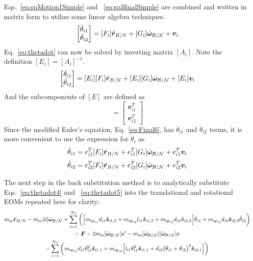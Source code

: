 \documentclass[paper]{aiaaNew}
\begin{document}
	Eqs.~\eqref{eq:spMotion1Simple} and ~\eqref{eq:sp3finalSimple} are combined and written in matrix form to utilize some linear algebra techniques.
	\begin{equation}
	[A_i]\begin{bmatrix}
	\ddot \theta_{i1}\\
	\ddot \theta_{i2}
	\end{bmatrix}
	= [F_i] \ddot{\bm r}_{B/N} + [G_i]\dot{\bm\omega}_{\cal B/N} + \bm v_i
	\label{eq:thetadot}
	\end{equation}
	Eq.~\eqref{eq:thetadot} can now be solved by inverting matrix $[A_i]$. Note the definition $[E_i] = [A_i]^{-1}$.
	\begin{equation}
	\begin{bmatrix}
	\ddot \theta_{i1}\\
	\ddot \theta_{i2}
	\end{bmatrix}
	= [E_i][F_i] \ddot{\bm r}_{B/N} + [E_i][G_i]\dot{\bm\omega}_{\cal B/N} + [E_i]\bm v_i
\label{eq:thetadot2}
\end{equation}
And the subcomponents of $[E]$ are defined as
\begin{equation}
[E] = \begin{bmatrix}
\bm e_{i1}^T\\
\bm e_{i2}^T
\end{bmatrix}
\label{eq:E}
\end{equation}
	Since the modified Euler's equation, Eq.~\eqref{eq:Final6}, has $\ddot \theta_{i1}$ and $\ddot \theta_{i2}$ terms, it is more convenient to use the expression for $\ddot \theta_i$ as
	\begin{equation}
	\ddot \theta_{i1}
	= e_{i1}^T[F_i] \ddot{\bm r}_{B/N} + e_{i1}^T[G_i]\dot{\bm\omega}_{\cal B/N} + e_{i1}^T\bm v_i
	\label{eq:thetadot4}
	\end{equation}
	\begin{equation}
\ddot \theta_{i2}
= e_{i2}^T[F_i] \ddot{\bm r}_{B/N} + e_{i2}^T[G_i]\dot{\bm\omega}_{\cal B/N} + e_{i2}^T\bm v_i
\label{eq:thetadot5}
\end{equation}

	
The next step in the back substitution method is to analytically substitute Eqs.~\eqref{eq:thetadot4} and ~\eqref{eq:thetadot5} into the translational and rotational EOMs repeated here for clarity:
\begin{multline}
m_\text{sc} \ddot{\bm r}_{B/N} -m_\text{sc} [\tilde{\bm{c}}] \dot{\bm\omega}_{\cal B/N} +  \sum_{i=1}^{N_{S}}\bigg(\Big[m_{\text{sp}_{i1}}d_{i1} \bm{\hat{s}}_{i1,3} +m_{\text{sp}_{i2}}l_{i1} \bm{\hat{s}}_{i1,3}+m_{\text{sp}_{i2}} d_{i2}\bm{\hat{s}}_{i2,3}\Big]\ddot{\theta}_{i1} +m_{\text{sp}_{i2}} d_{i2} \bm{\hat{s}}_{i2,3}\ddot{\theta}_{i2}\bigg) \\
= \bm F - 2m_\text{sc} [\tilde{\bm\omega}_{\cal B/N}] \bm c'- m_\text{sc} [\tilde{\bm\omega}_{\cal B/N}][\tilde{\bm\omega}_{\cal B/N}]\bm{c}\\
-\sum_{i=1}^{N_{S}}\bigg(m_{\text{sp}_{i1}}d_{i1} \dot{\theta}_{i1}^2 \bm{\hat{s}}_{i1,1} +m_{\text{sp}_{i2}}\Big[l_{i1} \dot{\theta}_{i1}^2 \bm{\hat{s}}_{i1,1} + d_{i2}\big(\dot{\theta}_{i1} + \dot{\theta}_{i2}\big)^2\bm{\hat{s}}_{i2,1}\Big]\bigg) 
\label{eq:Rbddot4}
\end{multline}
\end{document}
